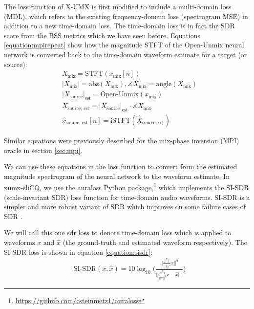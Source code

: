 \documentclass[report.tex]{subfiles}
\begin{document}
The loss function of X-UMX is first modified to include a multi-domain loss (MDL), which refers to the existing frequency-domain loss (spectrogram MSE) in addition to a new time-domain loss. The time-domain loss is in fact the SDR score from the BSS metrics which we have seen before. Equations \eqref{equation:mpirepeat} show how the magnitude STFT of the Open-Unmix neural network is converted back to the time-domain waveform estimate for a target (or source):
\begin{align}\tag{32}\label{equation:mpirepeat}
	\nonumber & X_{\text{mix}} = \text{STFT}(x_{\text{mix}}[n])\\
	\nonumber & |X_{\text{mix}}| = \text{abs}(X_{\text{mix}}), \measuredangle{X_{\text{mix}}} = \text{angle}(X_{\text{mix}})\\
	\nonumber & {|X_{\text{source}}|}_{\text{est}} = \text{Open-Unmix}(x_{\text{mix}})\\
	\nonumber & X_{\text{source, est}} = {|X_{\text{source}}|}_{\text{est}} \cdot \measuredangle{X_{\text{mix}}}\\
	\nonumber & \hat{x}_{\text{source, est}}[n] = \text{iSTFT}(\hat{X}_{\text{source, est}})
\end{align}

Similar equations were previously described for the mix-phase inversion (MPI) oracle in section \ref{sec:mpi}.

We can use these equations in the loss function to convert from the estimated magnitude spectrogram of the neural network to the waveform estimate. In xumx-sliCQ, we use the auraloss Python package,\footnote{\url{https://github.com/csteinmetz1/auraloss}} which implements the SI-SDR (scale-invariant SDR) \parencite{roux2018sdr} loss function for time-domain audio waveforms. SI-SDR is a simpler and more robust variant of SDR which improves on some failure cases of SDR \parencite{roux2018sdr}.

We will call this one $\text{sdr\_loss}$ to denote time-domain loss which is applied to waveforms $x$ and $\hat{x}$ (the ground-truth and estimated waveform respectively). The SI-SDR loss is shown in equation \eqref{equation:sisdr}:
\begin{align}
	& \text{SI-SDR}(x, \hat{x}) = 10 \log_{10}\Big(\frac{||\frac{\hat{x}^{T}x}{||x||^{2}} x||^{2}}{||\frac{\hat{x}^{T}x}{||x||^{2}} x - \hat{x}||^{2}}\Big)\tag{33}\label{equation:sisdr}
\end{align}
\end{document}
